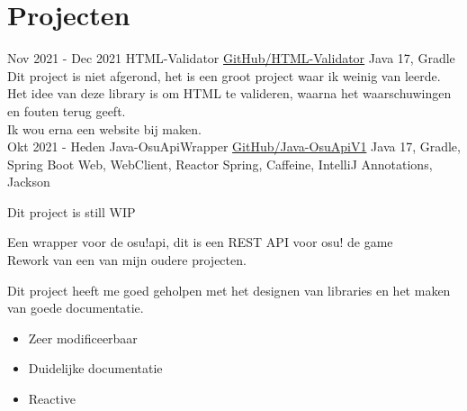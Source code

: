 \documentclass[letterpaper]{twentysecondcv} %
\begin{document}
    \section{Projecten}


    \begin{twenty} %
        \twentyitem
        {Nov 2021 -}
        {Dec 2021}
        {HTML-Validator}
        {\href{https://github.com/Tais993/HTML-Validator/}{GitHub/HTML-Validator}}
        {Java 17, Gradle}
        {
            Dit project is niet afgerond, het is een groot project waar ik weinig van leerde.\\

        Het idee van deze library is om HTML te valideren, waarna het waarschuwingen en fouten terug geeft.\\
        Ik wou erna een website bij maken.}\\

        \twentyitem
        {Okt 2021 -}
        {Heden}
        {Java-OsuApiWrapper}
        {\href{https://github.com/Tais993/Java-OsuApiV1/}{GitHub/Java-OsuApiV1}}
        {Java 17, Gradle, Spring Boot Web, WebClient, Reactor Spring, Caffeine, IntelliJ Annotations, Jackson}
        {
            Dit project is still WIP

            Een wrapper voor de osu!api, dit is een REST API voor osu! de game\\
        Rework van een van mijn oudere projecten.

        Dit project heeft me goed geholpen met het designen van libraries en het maken van goede documentatie.
            \begin{itemize}
                \item Zeer modificeerbaar
                \item Duidelijke documentatie
                \item Reactive
            \end{itemize}}\\
    \end{twenty}

    \newpage

    \makesidebarSecond %

\end{document}
